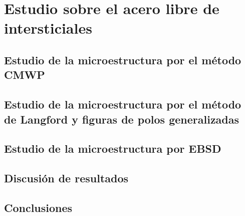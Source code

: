 \chapter{Estudio sobre el acero libre de intersticiales}
\graphicspath{{./figs/03_IF/}}
\section{Estudio de la microestructura por el método CMWP}\label{S:IFCMWP}
\section{Estudio de la microestructura por el método de Langford y figuras de polos generalizadas}\label{S:IFLANG}
\section{Estudio de la microestructura por EBSD}\label{S:IFEBSD}
\section{Discusión de resultados}\label{S:IFDis}
\section{Conclusiones}\label{S:IFConclusiones}
